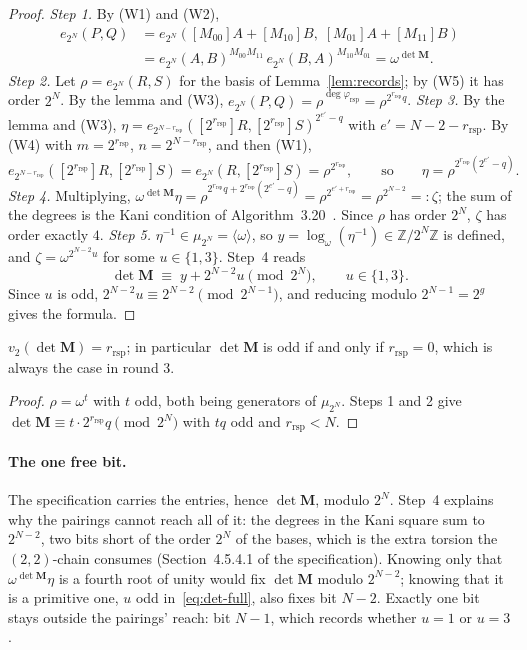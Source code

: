 \documentclass[version=preprint,notanonymous]{iacrcc}
\newcommand{\rrs}{r_{\mathrm{rsp}}}
\newcommand{\Mm}{\mathbf{M}}
\begin{document}
\begin{proof}
\emph{Step 1.} By (W1) and (W2),
\begin{align*}
  e_{2^N}(P, Q)
  &= e_{2^N}([M_{00}] A + [M_{10}] B,\; [M_{01}] A + [M_{11}] B) \\
  &= e_{2^N}(A, B)^{M_{00} M_{11}} \, e_{2^N}(B, A)^{M_{10} M_{01}}
  = \omega^{\det \Mm}.
\end{align*}
\emph{Step 2.} Let $\rho = e_{2^N}(R, S)$ for the basis of
Lemma~\ref{lem:records}; by (W5) it has order $2^N$. By the lemma and
(W3), $e_{2^N}(P, Q) = \rho^{\deg \varphi_{\mathrm{rsp}}} = \rho^{2^{\rrs}
q}$.
\emph{Step 3.} By the lemma and (W3), $\eta = e_{2^{N - \rrs}}([2^{\rrs}]
R, [2^{\rrs}] S)^{2^{e'} - q}$ with $e' = N - 2 - \rrs$. By (W4) with
$m = 2^{\rrs}$, $n = 2^{N - \rrs}$, and then (W1),
\[
  e_{2^{N - \rrs}}([2^{\rrs}] R, [2^{\rrs}] S)
  = e_{2^N}(R, [2^{\rrs}] S) = \rho^{2^{\rrs}},
  \qquad\text{so}\qquad
  \eta = \rho^{2^{\rrs}(2^{e'} - q)}.
\]
\emph{Step 4.} Multiplying, $\omega^{\det \Mm} \eta = \rho^{2^{\rrs} q +
2^{\rrs} (2^{e'} - q)} = \rho^{2^{e' + \rrs}} = \rho^{2^{N - 2}} =:
\zeta$; the sum of the degrees is the Kani condition of
Algorithm~3.20~\cite{kani}. Since $\rho$ has order $2^N$, $\zeta$ has
order exactly $4$.
\emph{Step 5.} $\eta^{-1} \in \mu_{2^N} = \langle \omega \rangle$, so $y
= \log_\omega(\eta^{-1}) \in \mathbb{Z}/2^N\mathbb{Z}$ is defined, and
$\zeta = \omega^{2^{N - 2} u}$ for some $u \in \{1, 3\}$. Step~4 reads
\begin{equation}
\label{eq:det-full}
  \det \Mm \;\equiv\; y + 2^{N - 2} u \pmod{2^N}, \qquad u \in \{1, 3\}.
\end{equation}
Since $u$ is odd, $2^{N - 2} u \equiv 2^{N - 2} \pmod{2^{N - 1}}$, and
reducing modulo $2^{N - 1} = 2^g$ gives the formula.
\end{proof}

\begin{corollary}
\label{cor:valuation}
$v_2(\det \Mm) = \rrs$; in particular $\det \Mm$ is odd if and only if
$\rrs = 0$, which is always the case in round 3.
\end{corollary}

\begin{proof}
$\rho = \omega^{t}$ with $t$ odd, both being generators of $\mu_{2^N}$.
Steps 1 and 2 give $\det \Mm \equiv t \cdot 2^{\rrs} q \pmod{2^N}$ with
$t q$ odd and $\rrs < N$.
\end{proof}

\paragraph{The one free bit.}
The specification carries the entries, hence $\det \Mm$, modulo $2^N$.
Step~4 explains why the pairings cannot reach all of it: the degrees in
the Kani square sum to $2^{N - 2}$, two bits short of the order $2^N$ of
the bases, which is the extra torsion the $(2,2)$-chain consumes
(Section~4.5.4.1 of the specification). Knowing only that
$\omega^{\det \Mm} \eta$ is a fourth root of unity would fix
$\det \Mm$ modulo $2^{N - 2}$; knowing that it is a primitive one, $u$
odd in~\eqref{eq:det-full}, also fixes bit $N - 2$. Exactly one bit
stays outside the pairings' reach: bit $N - 1$, which records whether
$u = 1$ or $u = 3$.
\end{document}
